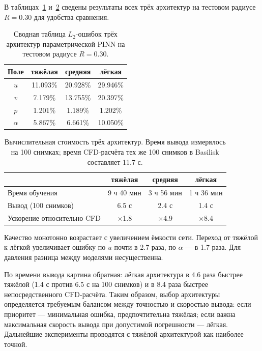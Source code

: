 В таблицах~\ref{tab:architecture_errors} и~\ref{tab:architecture_training_time}
сведены результаты всех трёх архитектур на тестовом радиусе \(R=0.30\) для
удобства сравнения.

\begin{table}[H]
    \centering
    \caption{Сводная таблица \(L_2\)-ошибок трёх архитектур параметрической PINN на тестовом радиусе \(R=0.30\).}
    \label{tab:architecture_errors}
    \begin{tabular}{c|ccc}
        \hline
        Поле & тяжёлая & средняя & лёгкая \\
        \hline
        \(u\) & 11.093\% & 20.928\% & 29.946\% \\
        \(v\) & 7.179\% & 13.755\% & 20.397\% \\
        \(p\) & 1.201\% & 1.189\% & 1.202\% \\
        \(\alpha\) & 5.867\% & 6.661\% & 10.050\% \\
        \hline
    \end{tabular}
\end{table}

\begin{table}[H]
    \centering
    \caption{Вычислительная стоимость трёх архитектур. Время вывода измерялось на 100 снимках;
             время CFD-расчёта тех же 100 снимков в Basilisk составляет 11.7 с.}
    \label{tab:architecture_training_time}
    \begin{tabular}{l|ccc}
        \hline
        & тяжёлая & средняя & лёгкая \\
        \hline
        Время обучения               & 9 ч 40 мин & 3 ч 56 мин & 1 ч 36 мин \\
        Вывод (100 снимков)          & 6.5 с      & 2.4 с      & 1.4 с      \\
        Ускорение относительно CFD   & $\times$1.8 & $\times$4.9 & $\times$8.4 \\
        \hline
    \end{tabular}
\end{table}

Качество монотонно возрастает с увеличением ёмкости сети. Переход от тяжёлой к
лёгкой увеличивает ошибку по \(u\) почти в 2.7 раза, по \(\alpha\) --- в 1.7
раза. Для давления разница между моделями несущественна.

По времени вывода картина обратная: лёгкая архитектура в 4.6 раза быстрее
тяжёлой (1.4 с против 6.5 с на 100 снимков) и в 8.4 раза быстрее
непосредственного CFD-расчёта. Таким образом, выбор архитектуры определяется
требуемым балансом между точностью и скоростью вывода: если приоритет ---
минимальная ошибка, предпочтительна тяжёлая; если важна максимальная скорость
вывода при допустимой погрешности --- лёгкая. Дальнейшие эксперименты
проводятся с тяжёлой архитектурой как наиболее точной.

